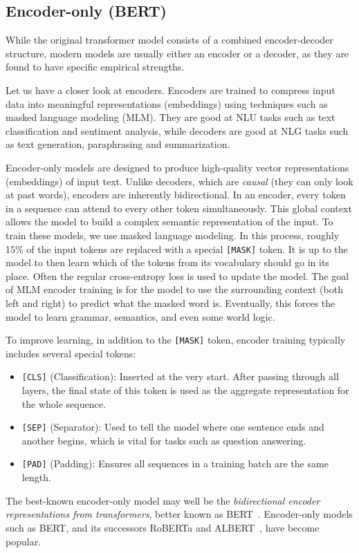 \subsection{Encoder-only (BERT)}
While the original transformer model consists of a combined encoder-decoder structure, modern models are usually either an encoder or a decoder, as they are found to have specific empirical strengths. 

Let us have a closer look at encoders.
Encoders are trained to compress input data into meaningful representations (embeddings) using techniques such as masked language modeling (MLM).
They are good at NLU tasks  such as text classification and sentiment analysis, while decoders are good at NLG tasks such as text generation, paraphrasing and summarization.

Encoder-only models are designed to produce high-quality vector representations (embeddings) of input text. Unlike decoders, which are {\em causal} (they can only look at past words), encoders are inherently bidirectional. In an encoder, every token in a sequence can attend to every other token simultaneously. This global context allows the model to build a complex semantic representation of the input. 
To train these models, we use masked language modeling. In this process, roughly 15\% of the input tokens are replaced with a special \texttt{[MASK]} token. It is up to the model to then learn which of the tokens from its vocabulary should go in its place. Often the regular cross-entropy loss is used to update the model. The goal of MLM encoder training is for the model to use the surrounding context (both left and right) to predict what the masked word is. Eventually, this forces the model to learn grammar, semantics, and even some world logic. 

To improve learning, in addition to the \texttt{[MASK]} token,  encoder training typically  includes several special tokens: 
\begin{itemize}
    \item \texttt{[CLS]} (Classification): Inserted at the very start. After passing through all layers, the final state of this token is used as the aggregate representation for the whole sequence. 
    \item \texttt{[SEP]} (Separator): Used to tell the model where one sentence ends and another begins, which is vital for tasks such as question answering.
    \item \texttt{[PAD]} (Padding): Ensures all sequences in a training batch are the same length.
\end{itemize}
The best-known encoder-only model may well be the {\em bidirectional encoder representations from transformers}, better known as BERT~\citep{devlin2018bert}. 
Encoder-only models such as BERT, and its successors RoBERTa \citep{liu2019roberta} and ALBERT~\citep{lan2019albert}, have become popular. 

